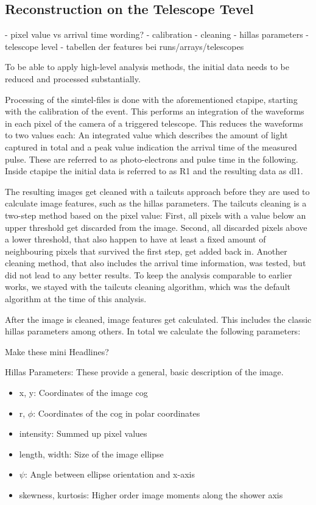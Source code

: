 \subsection{Reconstruction on the Telescope Tevel}
- pixel value vs arrival time wording?
- calibration
- cleaning
- hillas parameters 
- telescope level
- tabellen der features bei runs/arrays/telescopes

To be able to apply high-level analysis methods, the initial data 
needs to be reduced and processed substantially.

Processing of the simtel-files is done with the aforementioned ctapipe, starting with 
the calibration of the event. This performs an integration of the waveforms in 
each pixel of the camera of a triggered telescope. 
This reduces the waveforms to two values each: An integrated value which describes 
the amount of light captured in total and a peak value indication the arrival 
time of the measured pulse. These are referred to as 
photo-electrons and pulse time in the following.
Inside ctapipe the initial data is referred to as R1
and the resulting data as dl1. 

The resulting images get cleaned with a tailcuts approach before they are
used to calculate image features, such as the hillas parameters.
The tailcuts cleaning is a two-step method based on the pixel value:
First, all pixels with a value below an upper threshold get discarded from 
the image. Second, all discarded pixels above a lower threshold, that also 
happen to have at least a fixed amount of neighbouring pixels 
that survived the first step, get added back in.
Another cleaning method, that also includes the arrival time information, 
was tested, but did not lead to any better results.
To keep the analysis comparable to earlier works, we stayed with 
the tailcuts cleaning algorithm, which was the default algorithm at the time 
of this analysis.

After the image is cleaned, image features get calculated.
This includes the classic hillas parameters among others.
In total we calculate the following parameters:

Make these mini Headlines?

Hillas Parameters:
These provide a general, basic description of the image.
\begin{itemize}
    \item{x, y: Coordinates of the image cog}
    \item{r, $\phi$: Coordinates of the cog in polar coordinates}
    \item{intensity: Summed up pixel values}
    \item{length, width: Size of the image ellipse}
    \item{$\psi$: Angle between ellipse orientation and x-axis}
    \item{skewness, kurtosis: Higher order image moments along the shower axis}
\end{itemize}

